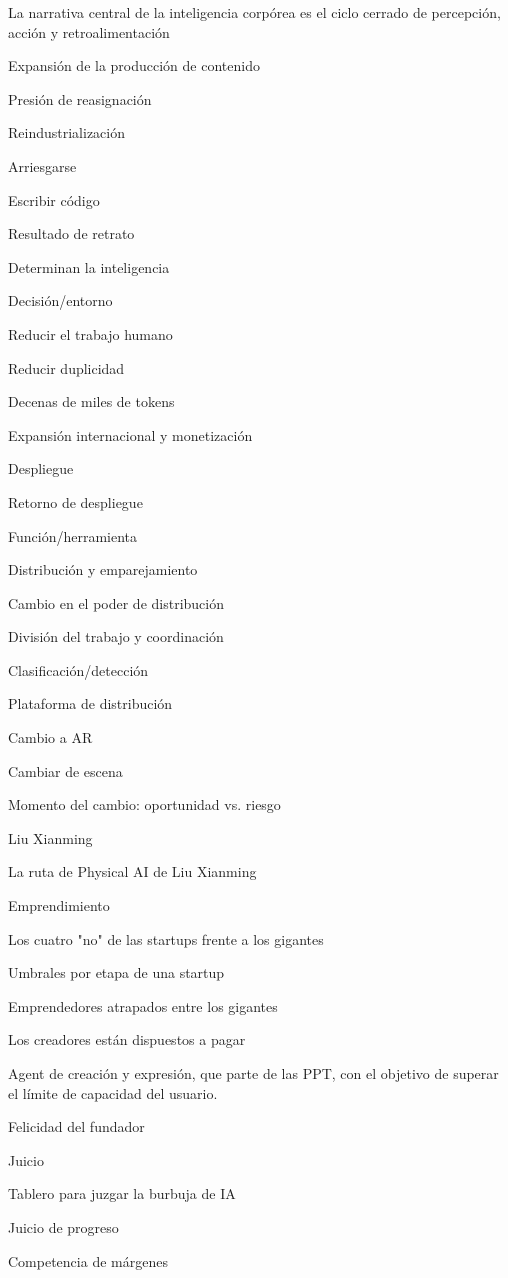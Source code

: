 \documentclass{article}
\begin{document}
La narrativa central de la inteligencia corpórea es el ciclo cerrado de percepción, acción y retroalimentación

Expansión de la producción de contenido

Presión de reasignación

Reindustrialización

Arriesgarse

Escribir código

Resultado de retrato

Determinan la inteligencia

Decisión/entorno

Reducir el trabajo humano

Reducir duplicidad

Decenas de miles de tokens

Expansión internacional y monetización

Despliegue

Retorno de despliegue

Función/herramienta

Distribución y emparejamiento

Cambio en el poder de distribución

División del trabajo y coordinación

Clasificación/detección

Plataforma de distribución

Cambio a AR

Cambiar de escena

Momento del cambio: oportunidad vs. riesgo

Liu Xianming

La ruta de Physical AI de Liu Xianming

Emprendimiento

Los cuatro "no" de las startups frente a los gigantes

Umbrales por etapa de una startup

Emprendedores atrapados entre los gigantes

Los creadores están dispuestos a pagar

Agent de creación y expresión, que parte de las PPT, con el objetivo de superar el límite de capacidad del usuario.

Felicidad del fundador

Juicio

Tablero para juzgar la burbuja de IA

Juicio de progreso

Competencia de márgenes
\end{document}
